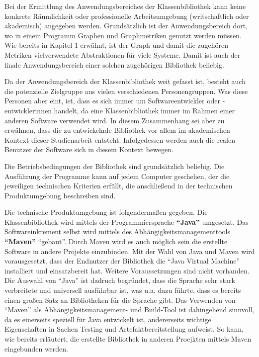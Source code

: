 \documentclass[a4paper,12pt,ngerman,chapterprefix=false,listof=totoc,bibliography=totoc]{scrreprt}
\begin{document}
{{{Bei der Ermittlung des Anwendungsbereiches der Klassenbibliothek kann keine konkrete Räumlichkeit oder professionelle Arbeitsumgebung (writschaftlich oder akademisch) angegeben werden. Grundsätzlich ist der Anwendungsbereich dort, wo in einem Programm Graphen und Graphmetriken genutzt werden müssen. Wie bereits in Kapitel 1 erwähnt, ist der Graph und damit die zugehören Metriken vielverwendete Abstraktionen für viele Systeme. \cite{turau_algorithmische_2004} Damit ist auch der finale Anwendungsbereich einer solchen zugehörigen Bibliothek beliebig.

Da der Anwendungsbereich der Klassenbibliothek weit gefasst ist, besteht auch die potenzielle Zielgruppe aus vielen verschiedenen Personengruppen. Was diese Personen aber eint, ist, dass es sich immer um Softwareentwickler oder -entwicklerinnen handelt, da eine Klassenbibliothek immer im Rahmen einer anderen Software verwendet wird. In diesem Zusammenhang sei aber zu erwähnen, dass die zu entwickelnde Bibliothek vor allem im akademischen Kontext dieser Studienarbeit entsteht. Infolgedessen werden auch die realen Benutzer der Software sich in diesem Kontext bewegen.

Die Betriebsbedingungen der Bibliothek sind grundsätzlich beliebig. Die Ausführung der Programme kann auf jedem Computer geschehen, der die jeweiligen technischen Kriterien erfüllt, die anschließend in der technischen Produktumgebung beschreiben sind.

Die technische Produktumgebung ist folgendermaßen gegeben. Die Klassenbibliothek wird mittels der Programmiersprache \textbf{"`Java"'} umgesetzt. Das Softwareinkrement selbst wird mittels des Abhängigkeitsmanagementtools \textbf{"`Maven"'} "`gebaut"'. Durch Maven wird es auch möglich sein die erstellte Software in andere Projekte einzubinden.  Mit der Wahl von Java und Maven wird vorausgesetzt, dass der Endnutzer der Bibliothek die "`Java Virtual Machine"' installiert und einsatzbereit hat. Weitere Voraussetzungen sind nicht vorhanden. Die Auswahl von "`Java"' ist dadruch begründet, dass die Sprache sehr stark verbreitete und universell ausführbar ist, was u.a. dazu führte, dass es bereits einen großen Satz an Bibliotheken für die Sprache gibt. Das Verwenden von "`Maven"' als Abhängigkeitsmanagement- und Build-Tool ist dahingehend sinnvoll, da es einerseits speziell für Java entwickelt ist, andererseits wichtige Eigenschaften in Sachen Testing und Artefaktbereitstellung aufweist. So kann, wie bereits erläutert, die erstellte Bibliothek in anderen Proejkten mittels Maven eingebunden werden. \cite{ullenboom_java_2016,srirangan_apache_2011}
}
}}
\end{document}
